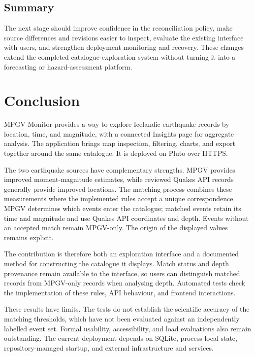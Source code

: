 \documentclass[12pt]{article}
\begin{document}
\subsection{Summary}

The next stage should improve confidence in the reconciliation policy, make source differences and revisions easier to inspect, evaluate the existing interface with users, and strengthen deployment monitoring and recovery. These changes extend the completed catalogue-exploration system without turning it into a forecasting or hazard-assessment platform.

\newpage

\section{Conclusion}
\label{sec:conclusion}
MPGV Monitor provides a way to explore Icelandic earthquake records by location, time, and magnitude, with a connected Insights page for aggregate analysis. The application brings map inspection, filtering, charts, and export together around the same catalogue. It is deployed on Pluto over HTTPS.

The two earthquake sources have complementary strengths. MPGV provides improved moment-magnitude estimates, while reviewed Quakes API records generally provide improved locations. The matching process combines these measurements where the implemented rules accept a unique correspondence. MPGV determines which events enter the catalogue; matched events retain its time and magnitude and use Quakes API coordinates and depth. Events without an accepted match remain MPGV-only. The origin of the displayed values remains explicit.

The contribution is therefore both an exploration interface and a documented method for constructing the catalogue it displays. Match status and depth provenance remain available to the interface, so users can distinguish matched records from MPGV-only records when analysing depth. Automated tests check the implementation of these rules, API behaviour, and frontend interactions.

These results have limits. The tests do not establish the scientific accuracy of the matching thresholds, which have not been evaluated against an independently labelled event set. Formal usability, accessibility, and load evaluations also remain outstanding. The current deployment depends on SQLite, process-local state, repository-managed startup, and external infrastructure and services.
\end{document}
